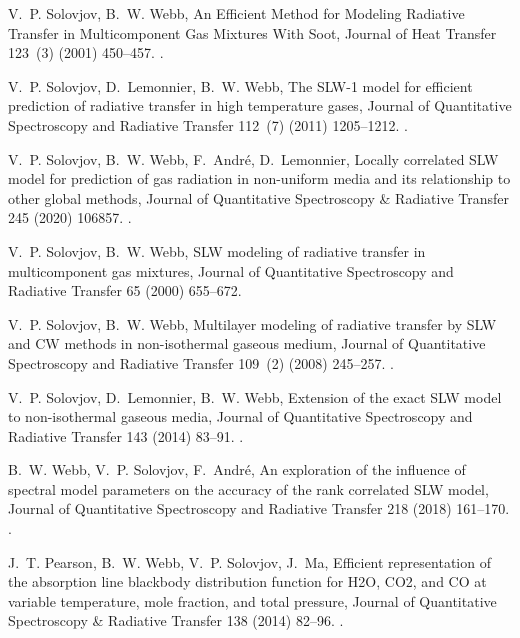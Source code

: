 \documentclass[preprint,12pt]{elsarticle}
\newcounter{bla}
\begin{document}
\begin{thebibliography}{10}
V.~P. Solovjov, B.~W. Webb, {An Efficient Method for Modeling Radiative
Transfer in Multicomponent Gas Mixtures With Soot}, {Journal of Heat
Transfer} 123~(3) (2001) 450--457.
\newblock \href {http://dx.doi.org/10.1115/1.1350824}
  {}.

V.~P. Solovjov, D.~Lemonnier, B.~W. Webb, {The {SLW}-1 model for efficient
prediction of radiative transfer in high temperature gases}, {Journal of
Quantitative Spectroscopy and Radiative Transfer} 112~(7) (2011) 1205--1212.
\newblock \href {http://dx.doi.org/10.1016/j.jqsrt.2010.08.009}
  {}.

V.~P. Solovjov, B.~W. Webb, F.~Andr{\'e}, D.~Lemonnier, {Locally correlated
{SLW} model for prediction of gas radiation in non-uniform media and its
relationship to other global methods}, {Journal of Quantitative Spectroscopy
{\&} Radiative Transfer} 245 (2020) 106857.
\newblock \href {http://dx.doi.org/10.1016/j.jqsrt.2020.106857}
  {}.

V.~P. Solovjov, B.~W. Webb, {{SLW} modeling of radiative transfer in
multicomponent gas mixtures}, {Journal of Quantitative Spectroscopy and
Radiative Transfer} 65 (2000) 655--672.

V.~P. Solovjov, B.~W. Webb, {Multilayer modeling of radiative transfer by {SLW}
and {CW} methods in non-isothermal gaseous medium}, {Journal of Quantitative
Spectroscopy and Radiative Transfer} 109~(2) (2008) 245--257.
\newblock \href {http://dx.doi.org/10.1016/j.jqsrt.2007.08.015}
  {}.

V.~P. Solovjov, D.~Lemonnier, B.~W. Webb, {Extension of the exact {SLW} model
to non-isothermal gaseous media}, {Journal of Quantitative Spectroscopy and
Radiative Transfer} 143 (2014) 83--91.
\newblock \href {http://dx.doi.org/10.1016/j.jqsrt.2013.10.008}
  {}.

B.~W. Webb, V.~P. Solovjov, F.~Andr{\'e}, {An exploration of the influence of
spectral model parameters on the accuracy of the rank correlated SLW model},
{Journal of Quantitative Spectroscopy and Radiative Transfer} 218 (2018)
161--170.
\newblock \href {http://dx.doi.org/10.1016/j.jqsrt.2018.06.023}
  {}.

J.~T. Pearson, B.~W. Webb, V.~P. Solovjov, J.~Ma, {Efficient representation of
the absorption line blackbody distribution function for H2O, CO2, and CO at
variable temperature, mole fraction, and total pressure}, {Journal of
Quantitative Spectroscopy {\&} Radiative Transfer} 138 (2014) 82--96.
\newblock \href {http://dx.doi.org/10.1016/j.jqsrt.2014.01.019}
  {}.


\end{thebibliography}
\end{document}
